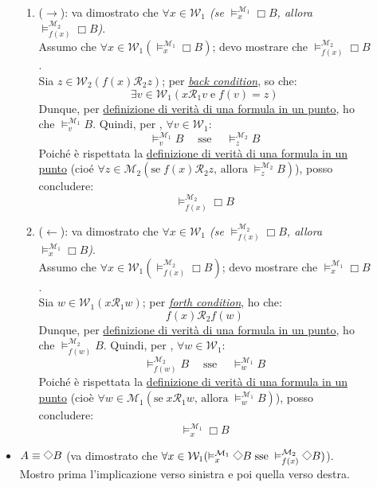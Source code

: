 \documentclass[a4paper,12pt]{article}
\newcommand{\latinmath}[1]{\text{\latinmodern{#1}}} %
\newcommand{\Dmd}{\mathord{\vcenter{\hbox{\tikz[baseline=-0.6ex]{\draw[line width=0.4pt, scale=1, rotate=45] (0,0) rectangle (0.2,0.2);}}}}} %
\begin{document}
\begin{dimo}
\begin{description}
\begin{itemize}
			\begin{enumerate}
				\item ($\to$): va dimostrato che \emph{$\forall x \in \mathcal{W}_1$ (se $\vDash_x^{\mathcal{M}_1} \Box B$, allora $\vDash_{f(x)}^{\mathcal{M}_2} \Box B$)}. \\
				Assumo che $\forall x \in \mathcal{W}_1 (\vDash_x^{\mathcal{M}_1} \Box B)$; devo mostrare che $\vDash_{f(x)}^{\mathcal{M}_2} \Box B$. \\
				Sia $z \in \mathcal{W}_2 (f(x)\mathcal{R}_2z)$; per \hyperlink{back}{\emph{back condition}}, so che:
				$$\exists v \in \mathcal{W}_1 (x\mathcal{R}_1v \; \text{e} \; f(v)=z)$$
				Dunque, per \hyperlink{defverp}{definizione di verità di una formula in un punto}, ho che $\vDash_v^{\mathcal{M}_1} B$. Quindi, per \latinmath{IH1}, $\forall v \in \mathcal{W}_1$:
				$$\vDash_v^{\mathcal{M}_1} B \quad \; \text{sse} \quad \; \vDash_{z}^{\mathcal{M}_2} B $$
				Poiché è rispettata la \hyperlink{defverp}{definizione di verità di una formula in un punto} (cioé $\forall z \in \mathcal{M}_2 (\text{se} \; f(x)\mathcal{R}_2z \text{, allora} \; \vDash_z^{\mathcal{M}_2} B)$), posso concludere: 
				$$\vDash_{f(x)}^{\mathcal{M}_2} \Box B$$
				\item ($\leftarrow$): va dimostrato che \emph{$\forall x \in \mathcal{W}_1$ (se $\vDash_{f(x)}^{\mathcal{M}_2} \Box B$, allora $\vDash_x^{\mathcal{M}_1} \Box B$)}. \\
				Assumo che $\forall x \in \mathcal{W}_1 (\vDash_{f(x)}^{\mathcal{M}_2} \Box B)$; devo mostrare che $\vDash_x^{\mathcal{M}_1} \Box B$. \\
				Sia $w \in \mathcal{W}_1(x\mathcal{R}_1w)$; per \hyperlink{forth}{\emph{forth condition}}, ho che:
				$$f(x)\mathcal{R}_2f(w)$$
				Dunque, per \hyperlink{defverp}{definizione di verità di una formula in un punto}, ho che $\vDash_{f(w)}^{\mathcal{M}_2} B$. Quindi, per \latinmath{IH1}, $\forall w \in \mathcal{W}_1$:
				$$\vDash_{f(w)}^{\mathcal{M}_2} B \quad \; \text{sse} \quad \; \vDash_{w}^{\mathcal{M}_1} B$$
				Poiché è rispettata la \hyperlink{defverp}{definizione di verità di una formula in un punto} (cioè $\forall w \in \mathcal{M}_1 (\text{se} \; x\mathcal{R}_1w \text{, allora} \; \vDash_w^{\mathcal{M}_1} B)$), posso concludere:
				$$\vDash_x^{\mathcal{M}_1} \Box B$$
			\end{enumerate}
			\item $A \equiv \Dmd B$ (va dimostrato che \emph{$\forall x \in \mathcal{W}_1 (\vDash_x^{\mathcal{M}_1} \Dmd B \; \text{sse} \; \vDash_{f(x)}^{\mathcal{M}_2} \Dmd B)$}). Mostro prima l'implicazione verso sinistra e poi quella verso destra. 

\end{itemize}
\end{description}
\end{dimo}
\end{document}
